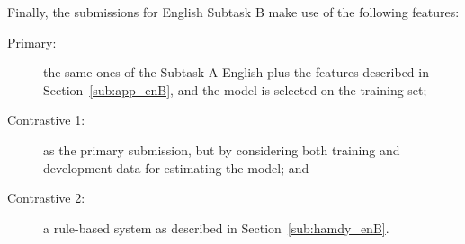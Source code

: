 Finally, the submissions for English Subtask B make use of the following 
features:
\begin{description}
 \item[Primary:] the same ones of the Subtask A-English plus the features 
described in Section~\ref{sub:app_enB}, and the model is selected on the 
training set; 
 \item[Contrastive 1:] as the primary submission, but by considering both 
training and development data for estimating the model; and
 \item[Contrastive 2:] a rule-based system as described in 
Section~\ref{sub:hamdy_enB}.
 \end{description}


